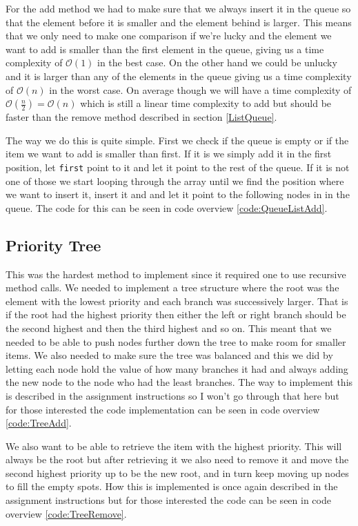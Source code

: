 \documentclass[a4paper,11pt]{article}
\begin{document}
For the add method we had to make sure that we always insert it in the queue so that the element before it is smaller 
and the element behind is larger. This means that we only need to make one comparison if we're lucky and the 
element we want to add is smaller than the first element in the queue, giving us a time complexity of $\mathcal{O}(1)$
in the best case. On the other hand we could be unlucky and it is larger than any of the elements in the queue giving 
us a time complexity of $\mathcal{O}(n)$ in the worst case. On average though we will have a time complexity of 
$\mathcal{O}(\frac{n}{2})=\mathcal{O}(n)$ which is still a linear time complexity to add but should be faster than 
the remove method described in section \ref{ListQueue}. 

The way we do this is quite simple. First we check if the queue is empty or if the item we want to add is smaller 
than first. If it is we simply add it in the first position, let {\tt first} point to it and let it point to the 
rest of the queue. If it is not one of those we start looping through the array until we find the position where 
we want to insert it, insert it and and let it point to the following nodes in in the queue. The code for this can 
be seen in code overview \ref{code:QueueListAdd}.

\subsection{Priority Tree}
This was the hardest method to implement since it required one to use recursive method calls. We needed to implement 
a tree structure where the root was the element with the lowest priority and each branch was successively larger. 
That is if the root had the highest priority then either the left or right branch should be the second highest 
and then the third highest and so on. This meant that we needed to be able to push nodes further down the tree 
to make room for smaller items. We also needed to make sure the tree was balanced and this we did by letting each node hold the value of 
how many branches it had and always adding the new node to the node who had the least branches. The way to implement 
this is described in the assignment instructions so I won't go through that here but for those interested the 
code implementation can be seen in code overview \ref{code:TreeAdd}.

We also want to be able to retrieve the item with the highest priority. This will always be the root but after 
retrieving it we also need to remove it and move the second highest priority up to be the new root, and in turn 
keep moving up nodes to fill the empty spots. How this is implemented is once again described in the assignment 
instructions but for those interested the code can be seen in code overview \ref{code:TreeRemove}.
\end{document}
